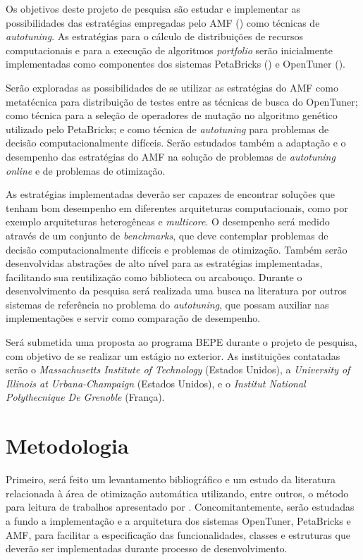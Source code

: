 \documentclass[a4paper, 11pt]{article}
\begin{document}
Os objetivos deste projeto de pesquisa são estudar e implementar as 
possibilidades das estratégias empregadas pelo AMF 
(\citet{goldman2012framework}) como técnicas de \emph{autotuning}. 
As estratégias para o cálculo de distribuições de recursos computacionais 
e para a execução de algoritmos \emph{portfolio} serão inicialmente 
implementadas como componentes dos sistemas PetaBricks (\citet{ansel2014phd}) e
OpenTuner (\citet{ansel2013opentuner}). 

Serão exploradas as possibilidades de se utilizar as estratégias
do AMF como metatécnica para distribuição de testes entre as técnicas de busca
do OpenTuner; como técnica para a seleção de operadores de mutação no algoritmo
genético utilizado pelo PetaBricks; e como técnica de \emph{autotuning} para 
problemas de decisão computacionalmente difíceis. Serão estudados também a 
adaptação e o desempenho das estratégias do AMF na solução de problemas de 
\emph{autotuning online} e de problemas de otimização.

As estratégias implementadas deverão ser capazes de encontrar soluções que 
tenham bom desempenho em diferentes arquiteturas computacionais,
como por exemplo arquiteturas heterogêneas e \emph{multicore}. 
O desempenho será medido através de um conjunto de \emph{benchmarks}, que deve 
contemplar problemas de decisão computacionalmente difíceis e problemas 
de otimização. Também serão desenvolvidas abstrações de alto nível para 
as estratégias implementadas, facilitando sua reutilização como 
biblioteca ou arcabouço. 
Durante o desenvolvimento da pesquisa será realizada uma busca na literatura
por outros sistemas de referência no problema do \emph{autotuning}, que possam
auxiliar nas implementações e servir como comparação de desempenho.

Será submetida uma proposta ao programa BEPE durante o projeto de 
pesquisa, com objetivo de se realizar um estágio no exterior. As
instituições contatadas serão o \emph{Massachusetts Institute of Technology}
(Estados Unidos), a \emph{University of Illinois at Urbana-Champaign} 
(Estados Unidos), e o \emph{Institut National Polythecnique De Grenoble} 
(França).


\section{Metodologia} \label{sec:met}

Primeiro, será feito um levantamento bibliográfico e um estudo da literatura 
relacionada à área de otimização automática utilizando, entre outros, o método 
para leitura de trabalhos apresentado por \citet{keshav2007howtoread}. 
Concomitantemente, serão  estudadas a fundo a implementação e a arquitetura dos
sistemas OpenTuner, PetaBricks e AMF, para facilitar a especificação das 
funcionalidades, classes e estruturas que deverão ser implementadas durante 
processo de desenvolvimento.
\end{document}
